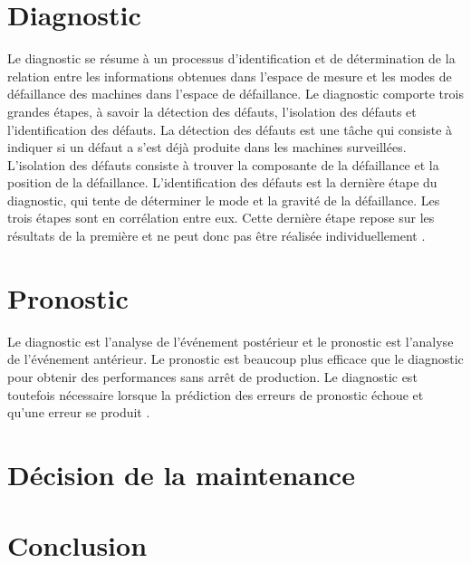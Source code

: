 \section{Diagnostic}
Le diagnostic se résume à un processus d'identification et de détermination de la relation entre les informations obtenues dans l'espace de mesure et les modes de défaillance des machines dans l'espace de défaillance. Le diagnostic comporte trois grandes étapes, à savoir la détection des défauts, l'isolation des défauts et l'identification des défauts. La détection des défauts est une tâche qui consiste à indiquer si un défaut a s'est déjà produite dans les machines surveillées. L'isolation des défauts consiste à trouver la composante de la défaillance et la position de la défaillance. L'identification des défauts est la dernière étape du diagnostic, qui tente de déterminer le mode et la gravité de la défaillance. Les trois étapes sont en corrélation entre eux. Cette dernière étape repose sur les résultats de la première et ne peut donc pas être réalisée individuellement \cite{Lei2016b}.
\section{Pronostic}

Le diagnostic est l'analyse de l'événement postérieur et le pronostic est l'analyse de l'événement antérieur. Le pronostic est beaucoup plus efficace que le diagnostic pour obtenir des performances sans arrêt de production. Le diagnostic est toutefois nécessaire lorsque la prédiction des erreurs de pronostic échoue et qu'une erreur se produit \cite{Jardine2006}.
\section{Décision de la maintenance}
\section{Conclusion}
